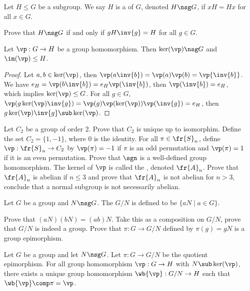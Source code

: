 \documentclass[10pt]{article}
\begin{document}
\begin{definition}
    Let $H\le G$ be a subgroup. We say $H$ is a  of $G$, denoted $H\nsg G$, if $xH=Hx$ for all $x\in G$.
\end{definition}
\begin{problem}
    Prove that $H\nsg G$ if and only if $gH\inv{g}=H$ for all $g\in G$.
\end{problem}
\begin{proposition}
    Let $\vp:G\to H$ be a group homomorphism. Then $\ker(\vp)\nsg G$ and $\im(\vp)\le H$.
\end{proposition}
\begin{proof}
    Let $a,b\in\ker(\vp)$, then $\vp(a\inv{b})=\vp(a)\vp(b)=\vp{\inv{b}}$. We have ${e}_{H}=\vp(b\inv{b})={e}_{H}\vp(\inv{b})$, then $\vp({\inv{b}})={e}_{H}$, which implies $\ker(\vp)\le G$. For all $g\in G$, $\vp(g\ker(\vp)\inv{g})=\vp(g)\vp(\ker(\vp))\vp(\inv{g})={e}_{H}$, then $g\ker(\vp)\inv{g}\sub\ker(\vp)$.
\end{proof}
\begin{problem}
    Let ${C}_{2}$ be a group of order 2. Prove that ${C}_{2}$ is unique up to isomorphim. Define the set ${C}_{2}=\{1,-1\}$, where $0$ is the identity. For all $\pi\in{\fr{S}}_{n}$, define $\vp:{\fr{S}}_{n}\to{C}_{2}$ by $\vp(\pi)=-1$ if $\pi$ is an odd permutation and $\vp(\pi)=1$ if it is an even permutation. Prove that $\sgn$ is a well-defined group homomorphism. The kernel of $\vp$ is called the , denoted ${\fr{A}}_{n}$. Prove that ${\fr{A}}_{n}$ is abelian if $n\le 3$ and prove that ${\fr{A}}_{n}$ is not abelian for $n>3$, conclude that a normal subgroup is not necessarily abelian.
\end{problem}
\begin{definition}
    Let $G$ be a group and $N\nsg G$. The  $G/N$ is defined to be $\{aN\mid a\in G\}$. 
\end{definition}
\begin{problem}
    Prove that $(aN)(bN)=(ab)N$. Take this as a composition on $G/N$, prove that $G/N$ is indeed a group. Prove that $\pi:G\to G/N$ defined by $\pi(g)=gN$ is a group epimorphism.
\end{problem}
\begin{Universal property for quotient groups}
    Let $G$ be a group and let $N\nsg G$. Let $\pi:G\to G/N$ be the quotient epimorphism. For all group homomorphism $\vp:G\to H$ with $N\sub\ker(\vp)$, there exists a unique group homomorphism $\wb{\vp}:G/N\to H$ such that $\wb{\vp}\comp\pi=\vp$.
\end{Universal property for quotient groups}
\end{document}
